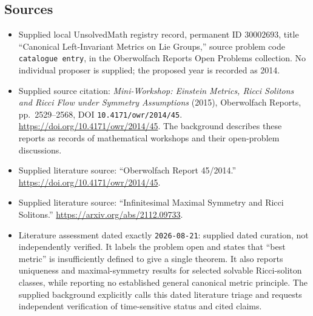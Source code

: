 \documentclass[11pt]{article}
\begin{document}
\subsection{Sources}
\begin{itemize}
\item Supplied local UnsolvedMath registry record, permanent ID \(30002693\), title ``Canonical Left-Invariant Metrics on Lie Groups,'' source problem code \texttt{catalogue entry}, in the Oberwolfach Reports Open Problems collection. No individual proposer is supplied; the proposed year is recorded as 2014.
\item Supplied source citation: \emph{Mini-Workshop: Einstein Metrics, Ricci Solitons and Ricci Flow under Symmetry Assumptions} (2015), Oberwolfach Reports, pp.~2529--2568, DOI \texttt{10.4171/owr/2014/45}. \url{https://doi.org/10.4171/owr/2014/45}. The background describes these reports as records of mathematical workshops and their open-problem discussions.
\item Supplied literature source: ``Oberwolfach Report 45/2014.'' \url{https://doi.org/10.4171/owr/2014/45}.
\item Supplied literature source: ``Infinitesimal Maximal Symmetry and Ricci Solitons.'' \url{https://arxiv.org/abs/2112.09733}.
\item Literature assessment dated exactly \texttt{2026-08-21}: supplied dated curation, not independently verified. It labels the problem open and states that ``best metric'' is insufficiently defined to give a single theorem. It also reports uniqueness and maximal-symmetry results for selected solvable Ricci-soliton classes, while reporting no established general canonical metric principle. The supplied background explicitly calls this dated literature triage and requests independent verification of time-sensitive status and cited claims.
\end{itemize}
\end{document}
